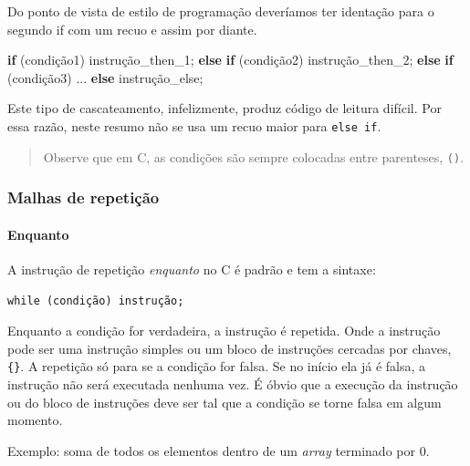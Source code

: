 \documentclass[
]{article}
\newenvironment{Shaded}{}{}
\newcommand{\ControlFlowTok}[1]{\textcolor[rgb]{0.00,0.44,0.13}{\textbf{#1}}}
\newcommand{\NormalTok}[1]{#1}
\begin{document}
Do ponto de vista de estilo de programação deveríamos ter identação para
o segundo if com um recuo e assim por diante.

\begin{Shaded}
\begin{Highlighting}[]
\ControlFlowTok{if}\NormalTok{ (condição1)}
\NormalTok{  instrução_then_1;}
\ControlFlowTok{else}
  \ControlFlowTok{if}\NormalTok{ (condição2)}
\NormalTok{    instrução_then_2;}
  \ControlFlowTok{else}
    \ControlFlowTok{if}\NormalTok{ (condição3)}
\NormalTok{      ...}
                \ControlFlowTok{else}\NormalTok{ instrução_else;}
\end{Highlighting}
\end{Shaded}

Este tipo de cascateamento, infelizmente, produz código de leitura
difícil. Por essa razão, neste resumo não se usa um recuo maior para
\texttt{else\ if}.

\begin{quote}
Observe que em C, as condições são sempre colocadas entre parenteses,
\texttt{()}.
\end{quote}

\hypertarget{malhas-de-repetiuxe7uxe3o}{%
\subsubsection{Malhas de repetição}\label{malhas-de-repetiuxe7uxe3o}}

\hypertarget{enquanto}{%
\paragraph{Enquanto}\label{enquanto}}

A instrução de repetição \emph{enquanto} no C é padrão e tem a sintaxe:

\begin{verbatim}
while (condição) instrução;
\end{verbatim}

Enquanto a condição for verdadeira, a instrução é repetida. Onde a
instrução pode ser uma instrução simples ou um bloco de instruções
cercadas por chaves, \texttt{\{\}}. A repetição só para se a condição
for falsa. Se no início ela já é falsa, a instrução não será executada
nenhuma vez. É óbvio que a execução da instrução ou do bloco de
instruções deve ser tal que a condição se torne falsa em algum momento.

Exemplo: soma de todos os elementos dentro de um \emph{array} terminado
por 0.
\end{document}
